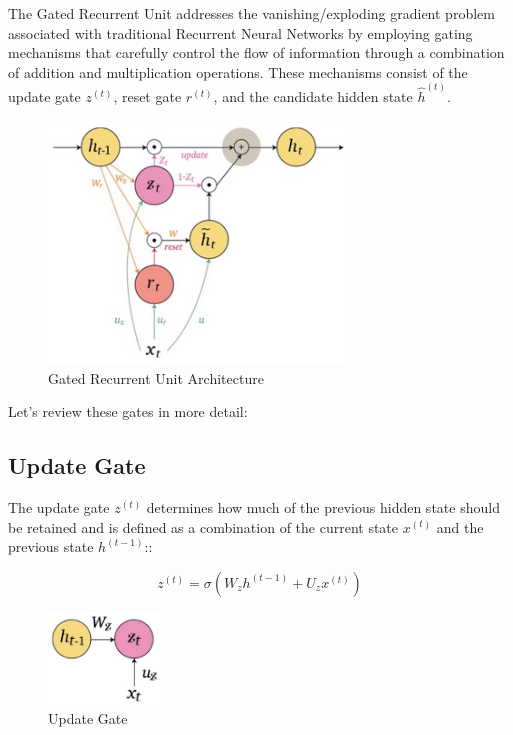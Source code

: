 \noindent The Gated Recurrent Unit addresses the vanishing/exploding gradient problem associated with traditional Recurrent Neural Networks by employing gating mechanisms that carefully control the flow of information through a combination of addition and multiplication operations. These mechanisms consist of the update  gate $z^{(t)}$, reset gate $r^{(t)}$, and the candidate hidden state $\hat{h}^{(t)}$.



\begin{figure}[h]
    \centering
    \includegraphics[width=8cm]{Images/gru-architecture.png}
    \caption{Gated Recurrent Unit Architecture}
    \label{fig:gru-architecture}
\end{figure}


\noindent Let's review these gates in more detail:


\subsection{Update Gate}

The update gate $z^{(t)}$ determines how much of the previous hidden state should be retained and is defined as a combination of the current state $x^{(t)}$ and the previous state $h^{(t-1)}$::

$$ z^{(t)} = \sigma \left( W_z h^{(t-1)} + U_z x^{(t)} \right)  $$

\begin{figure}[h]
    \centering
    \includegraphics[width=3cm]{Images/update-gate.png}
    \caption{Update Gate}
    \label{fig:update-gate}
\end{figure}

